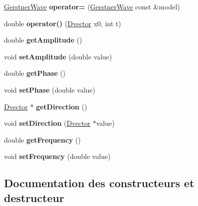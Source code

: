 \begin{DoxyCompactItemize}
\item 
\mbox{\label{class_gerstner_wave_ae776ca443eb1bf78bcb296686ccf27ae}} 
\hyperlink{class_gerstner_wave}{Gerstner\+Wave} {\bfseries operator=} (\hyperlink{class_gerstner_wave}{Gerstner\+Wave} const \&model)
\item 
\mbox{\label{class_gerstner_wave_aef62ae747a5a0224e026df4441cfb857}} 
double {\bfseries operator()} (\hyperlink{class_dvector}{Dvector} x0, int t)
\item 
\mbox{\label{class_gerstner_wave_a4b3989096ad666a3daf18c9e61a33818}} 
double {\bfseries get\+Amplitude} ()
\item 
\mbox{\label{class_gerstner_wave_a3b499d792884b962fadfd58b3003c2c2}} 
void {\bfseries set\+Amplitude} (double value)
\item 
\mbox{\label{class_gerstner_wave_aec45e17327906cf1aa7e746a5cd92596}} 
double {\bfseries get\+Phase} ()
\item 
\mbox{\label{class_gerstner_wave_a4e5a1f7f408d79bb2eab24cdfa5cdf08}} 
void {\bfseries set\+Phase} (double value)
\item 
\mbox{\label{class_gerstner_wave_ade0e4f9a29e27253a7096cf37dcd52d6}} 
\hyperlink{class_dvector}{Dvector} $\ast$ {\bfseries get\+Direction} ()
\item 
\mbox{\label{class_gerstner_wave_a722535521e43ba6f6c5e28a578ee824b}} 
void {\bfseries set\+Direction} (\hyperlink{class_dvector}{Dvector} $\ast$value)
\item 
\mbox{\label{class_gerstner_wave_a254b842667e2a2c6ce10f0f7b965c458}} 
double {\bfseries get\+Frequency} ()
\item 
\mbox{\label{class_gerstner_wave_a7ea4b613d091da359115183c43ddeb2a}} 
void {\bfseries set\+Frequency} (double value)
\end{DoxyCompactItemize}


\subsection{Documentation des constructeurs et destructeur}
\mbox{\label{class_gerstner_wave_aca3a91ab8ae49e3814bfd5b6e4607f31}} 
